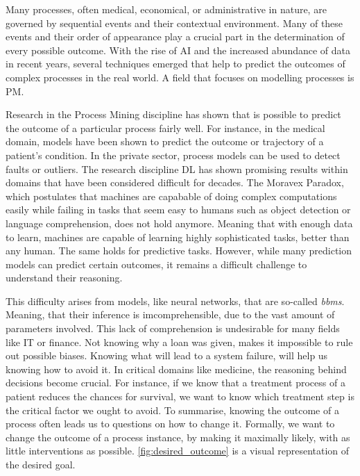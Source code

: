 \documentclass[./../../paper.tex]{subfiles}
\begin{document}
Many processes, often medical, economical, or administrative in nature, are governed by sequential events and their contextual environment. Many of these events and their order of appearance play a crucial part in the determination of every possible outcome\autocite{vanderaalst_ProcessMiningManifesto_2012}. With the rise of AI and the increased abundance of data in recent years, several techniques emerged that help to predict the outcomes of complex processes in the real world. A field that focuses on modelling processes is \gls{PM}.

Research in the Process Mining discipline has shown that is possible to predict the outcome of a particular process fairly well\autocites{tax_PredictiveBusinessProcess_2017a,klimek_Longtermseriesforecasting_2021}. 
For instance, in the medical domain, models have been shown to predict the outcome or trajectory of a patient's condition\autocite{mannhardt_Analyzingtrajectoriespatients_2017}. In the private sector, process models can be used to detect faults or outliers. The research discipline \gls{DL} has shown promising results within domains that have been considered difficult for decades. The Moravex Paradox\autocite{agrawal_studyphenomenonMoravec_2010}, which postulates that machines are capabable of doing complex computations easily while failing in tasks that seem easy to humans such as object detection or language comprehension, does not hold anymore. Meaning that with enough data to learn, machines are capable of learning highly sophisticated tasks, better than any human. The same holds for predictive tasks. However, while many prediction models can predict certain outcomes, it remains a difficult challenge to understand their reasoning. 

This difficulty arises from models, like neural networks, that are so-called \emph{\glspl{bbm}}. Meaning, that their inference is imcomprehensible, due to the vast amount of parameters involved. This lack of comprehension is undesirable for many fields like IT or finance. Not knowing why a loan was given, makes it impossible to rule out possible biases. Knowing what will lead to a system failure, will help us knowing how to avoid it. In critical domains like medicine, the reasoning behind decisions become crucial. For instance, if we know that a treatment process of a patient reduces the chances for survival, we want to know which treatment step is the critical factor we ought to avoid. To summarise, knowing the outcome of a process often leads us to questions on how to change it. Formally, we want to change the outcome of a process instance, by making it maximally likely, with as little interventions as possible\autocite{molnar2019}. \autoref{fig:desired_outcome} is a visual representation of the desired goal.
\end{document}
